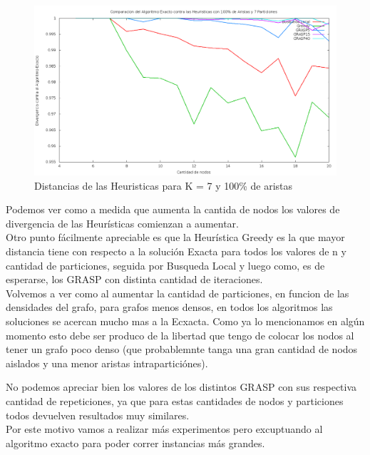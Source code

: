 \begin{figure}[H]
\begin{center}
\includegraphics[scale=0.3]{finales/ComparacionesCon7Particiones100Aristas.png}
\caption{Distancias de las Heuristicas para K = 7 y 100\% de aristas}
\end{center}
\end{figure}



Podemos ver como a medida que aumenta la cantida de nodos los valores de divergencia de las Heur\'isticas comienzan a aumentar.\\

Otro punto f\'acilmente apreciable es que la Heur\'istica Greedy es la que mayor distancia tiene con respecto a la soluci\'on Exacta para todos los valores de n y cantidad de particiones, seguida por Busqueda Local y luego como, es de esperarse, los GRASP con distinta cantidad de iteraciones.\\

Volvemos a ver como al aumentar la cantidad de particiones, en funcion de las densidades del grafo, para grafos menos densos, en todos los algoritmos las soluciones se acercan mucho mas a la Ecxacta. Como ya lo mencionamos en alg\'un momento esto debe ser produco de la libertad que tengo de colocar los nodos al tener un grafo poco denso (que probablemnte tanga una gran cantidad de nodos aislados y una menor aristas intrapartici\'ones).

No podemos apreciar bien los valores de los distintos GRASP con sus respectiva cantidad de repeticiones, ya que para estas cantidades de nodos y particiones todos devuelven resultados muy similares.\\
Por este motivo vamos a realizar m\'as experimentos pero excuptuando al algoritmo exacto para poder correr instancias m\'as grandes.


